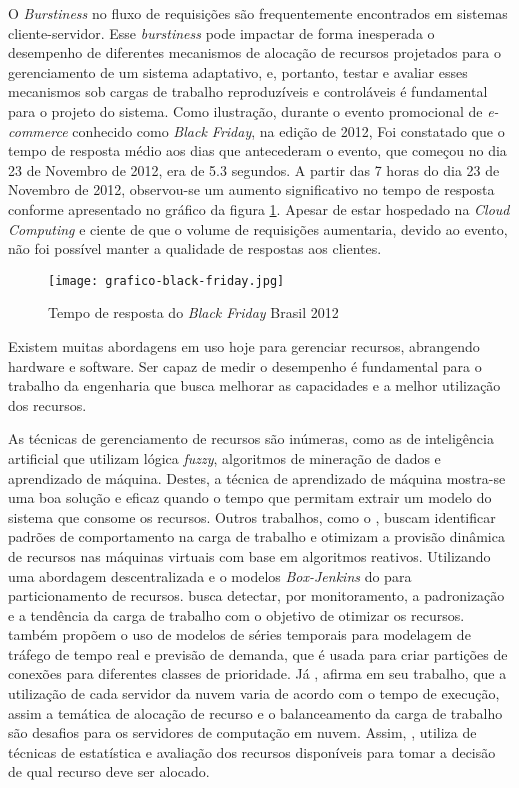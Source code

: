 O \textit{Burstiness} no fluxo de requisições são frequentemente encontrados em sistemas cliente-servidor. Esse \textit{burstiness} pode impactar de forma inesperada o desempenho de diferentes mecanismos de alocação de recursos projetados para o gerenciamento de um sistema adaptativo, e, portanto, testar e avaliar esses mecanismos sob cargas de trabalho reproduzíveis e controláveis é fundamental para o projeto do sistema.  Como ilustração, durante o evento promocional de \textit{e-commerce} conhecido como \textit{Black Friday}, na edição de 2012, Foi constatado que o tempo de resposta médio aos dias que antecederam o evento, que começou no dia 23 de Novembro de 2012, era de 5.3 segundos. A partir das 7 horas do dia 23 de Novembro de 2012, observou-se um aumento significativo no tempo de resposta conforme apresentado no gráfico da figura \ref{fig:grafico-black-friday}. Apesar de estar hospedado na \textit{Cloud Computing} e ciente de que o volume de requisições aumentaria, devido ao evento, não foi possível manter a qualidade de respostas aos clientes.

\begin{figure}[htb]
	\centering
	\texttt{[image: grafico-black-friday.jpg]}
	\caption{Tempo de resposta do \textit{Black Friday} Brasil 2012}
	\label{fig:grafico-black-friday}
\end{figure}


Existem muitas abordagens em uso hoje para gerenciar recursos, abrangendo hardware e software. Ser capaz de medir o desempenho é fundamental para o trabalho da engenharia que busca melhorar as capacidades e a melhor utilização dos recursos.

As técnicas de gerenciamento de recursos são inúmeras, como as de inteligência artificial que utilizam lógica \textit{fuzzy}, algoritmos de mineração de dados e aprendizado de máquina. Destes, a técnica de aprendizado de máquina mostra-se uma boa solução e eficaz quando o tempo que permitam extrair um modelo do sistema que consome os recursos. Outros trabalhos, como o , buscam identificar padrões de comportamento na carga de trabalho e otimizam a provisão dinâmica de recursos nas máquinas virtuais com base em algoritmos reativos. Utilizando uma abordagem descentralizada e o modelos \textit{Box-Jenkins} do  para particionamento de recursos.  busca detectar, por monitoramento, a padronização e a tendência da carga de trabalho com o objetivo de otimizar os recursos.  também propõem o uso de modelos de séries temporais para modelagem de tráfego de tempo real e previsão de demanda, que é usada para criar partições de conexões para diferentes classes de prioridade. Já , afirma em seu trabalho, que a utilização de cada servidor da nuvem varia de acordo com o tempo de execução, assim a temática de alocação de recurso e o balanceamento da carga de trabalho são desafios para os servidores de computação em nuvem. Assim, , utiliza de técnicas de estatística e avaliação dos recursos disponíveis para tomar a decisão de qual recurso deve ser alocado.

